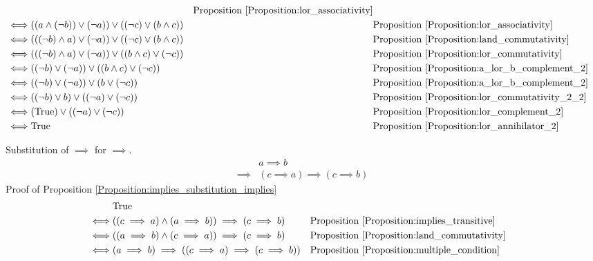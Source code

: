 \begin{prop}
\begin{align*}
& & \text{Proposition \ref{Proposition:lor_associativity}} \\
\iff & ((a \land (\lnot b)) \lor (\lnot a)) \lor ((\lnot c) \lor (b \land c))
& & \text{Proposition \ref{Proposition:lor_associativity}} \\
\iff & (((\lnot b) \land a) \lor (\lnot a)) \lor ((\lnot c) \lor (b \land c))
& & \text{Proposition \ref{Proposition:land_commutativity}} \\
\iff & (((\lnot b) \land a) \lor (\lnot a)) \lor ((b \land c) \lor (\lnot c))
& & \text{Proposition \ref{Proposition:lor_commutativity}} \\
\iff & ((\lnot b) \lor (\lnot a)) \lor ((b \land c) \lor (\lnot c))
& & \text{Proposition \ref{Proposition:a_lor_b_complement_2}} \\
\iff & ((\lnot b) \lor (\lnot a)) \lor (b \lor (\lnot c))
& & \text{Proposition \ref{Proposition:a_lor_b_complement_2}} \\
\iff & ((\lnot b) \lor b) \lor ((\lnot a) \lor (\lnot c))
& & \text{Proposition \ref{Proposition:lor_commutativity_2_2}} \\
\iff & (\text{True}) \lor ((\lnot a) \lor (\lnot c))
& & \text{Proposition \ref{Proposition:lor_complement_2}} \\
\iff & \text{True}
& & \text{Proposition \ref{Proposition:lor_annihilator_2}} \\
\end{align*}
\end{prop}

\begin{prop}
\label{Proposition:implies_substitution_implies}
Substitution of $\implies$ for $\implies$.
\begin{align*}
& a \implies b \\
\implies & (c \implies a) \implies (c \implies b)
\end{align*}
Proof of Proposition \ref{Proposition:implies_substitution_implies}
\begin{align*}
& \text{True} \\
\iff & ((c \implies a) \land (a \implies b)) \implies (c \implies b)
& & \text{Proposition \ref{Proposition:implies_transitive}} \\
\iff & ((a \implies b) \land (c \implies a)) \implies (c \implies b)
& & \text{Proposition \ref{Proposition:land_commutativity}} \\
\iff & (a \implies b) \implies ((c \implies a) \implies (c \implies b))
& & \text{Proposition \ref{Proposition:multiple_condition}} \\
\end{align*}
\end{prop}


